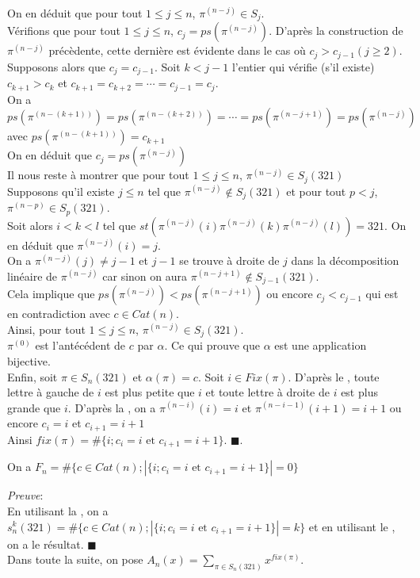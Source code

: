 On en déduit que pour tout $1\leq j \leq n$, $\pi^{(n-j)}\in S_{j}$.\vspace{7pt}\\
Vérifions que pour tout $1 \leq j \leq n$, $c_{j} = ps(\pi^{(n-j)})$. D'après la construction de $\pi^{(n-j)}$ précèdente, cette dernière est  évidente dans le cas où $c_{j}> c_{j-1} (j\geq 2)$.
Supposons alors que $c_{j}=c_{j-1}$.
Soit $k<j-1$ l'entier qui vérifie (s'il existe) $c_{k+1}>c_{k}$ et $c_{k+1}=c_{k+2}=\cdots =c_{j-1}=c_{j}$. \\
On a $ps(\pi^{(n-(k+1))}) = ps(\pi^{(n-(k+2))}) = \cdots  = ps(\pi^{(n-j+1)})= ps(\pi^{(n-j)})$ avec $ps(\pi^{(n-(k+1))})=c_{k+1}$\\
On en déduit que $c_{j} = ps(\pi^{(n-j)})$\vspace{7pt}\\
Il nous reste à montrer que pour tout $1 \leq j \leq n$,  $\pi^{(n-j)}\in S_{j}(321)$\\
Supposons qu'il existe $j\leq n$ tel que $\pi^{(n-j)} \notin S_{j}(321)$ et pour tout $p<j$, $\pi^{(n-p)}\in S_{p}(321)$.\\
Soit alors $i<k<l$ tel que $st(\pi^{(n-j)}(i)\pi^{(n-j)}(k)\pi^{(n-j)}(l))=321$.
On en déduit que $\pi^{(n-j)}(i)=j$.\\
On a $\pi^{(n-j)}(j)\neq j-1$ et  $j-1$ se trouve à droite de $j$  dans la décomposition linéaire de $\pi^{(n-j)}$ car sinon on aura $\pi^{(n-j+1)}\notin S_{j-1}(321)$.\\
Cela implique que $ps(\pi^{(n-j)})< ps(\pi^{(n-j+1)})$ ou encore $c_{j}<c_{j-1}$ qui est en contradiction avec $c\in Cat(n)$.\\
Ainsi, pour tout $1 \leq j \leq n$,   $\pi^{(n-j)}\in S_{j}(321)$.\\
$\pi^{(0)}$ est l'antécédent de $c$ par $\alpha$. Ce qui prouve que $\alpha$ est une application bijective.\vspace{10pt}\\
Enfin, soit $\pi\in S_{n}(321)$ et $\alpha(\pi)=c$. Soit $i\in Fix(\pi)$.
D'après le , toute lettre à gauche de $i$ est plus petite que $i$ et toute lettre à droite de $i$ est plus grande que $i$. D'après la , on a $\pi^{(n-i)}(i)=i$ et $\pi^{(n-i-1)}(i+1)=i+1$ ou encore $c_{i}=i$ et $c_{i+1}=i+1$\\
Ainsi $fix(\pi)=\#\{i; c_{i}=i \text{ et }c_{i+1}=i+1\}$. $\blacksquare$.

\begin{corollaire}
	On a $F_{n}= \#\{ c\in Cat(n); | \{i; c_{i}=i \text{ et } c_{i+1}=i+1\} |=0 \}$
\end{corollaire}
\textit{Preuve}: \\ En utilisant la , on a $s_{n}^{k}(321) = \#\{ c\in Cat(n); | \{i; c_{i}=i \text{ et } c_{i+1}=i+1\} |=k \}$ et en utilisant le , on a le résultat. $\blacksquare$\vspace{10pt}\\
Dans toute la suite, on pose $A_{n}(x)= \underset{\pi \in S_{n}(321)}{\sum}x^{fix(\pi)}$.

